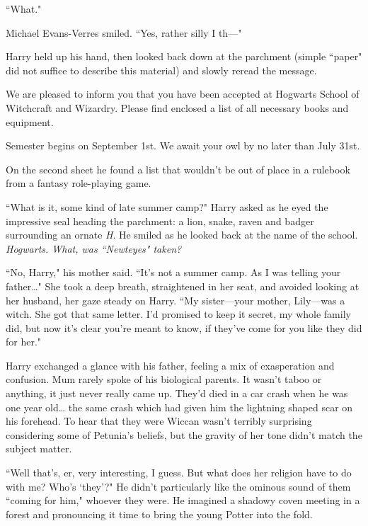 ``What."

Michael Evans-Verres smiled. ``Yes, rather silly I th---"

Harry held up his hand, then looked back down at the parchment (simple ``paper" did not suffice to describe this material) and slowly reread the message.

\begin{writtenNote}

We are pleased to inform you that you have been accepted at Hogwarts School of Witchcraft and Wizardry. Please find enclosed a list of all necessary books and equipment.

Semester begins on September 1st. We await your owl by no later than July 31st.


\end{writtenNote}

On the second sheet he found a list that wouldn't be out of place in a rulebook from a fantasy role-playing game.

``What is it, some kind of late summer camp?" Harry asked as he eyed the impressive seal heading the parchment: a lion, snake, raven and badger surrounding an ornate \emph{H}. He smiled as he looked back at the name of the school. \emph{Hogwarts. What, was ``Newteyes" taken?}

``No, Harry," his mother said. ``It's not a summer camp. As I was telling your father{\ldots}" She took a deep breath, straightened in her seat, and avoided looking at her husband, her gaze steady on Harry. ``My sister---your mother, Lily---was a witch. She got that same letter. I'd promised to keep it secret, my whole family did, but now it's clear you're meant to know, if they've come for you like they did for her."

Harry exchanged a glance with his father, feeling a mix of exasperation and confusion. Mum rarely spoke of his biological parents. It wasn't taboo or anything, it just never really came up. They'd died in a car crash when he was one year old{\ldots} the same crash which had given him the lightning shaped scar on his forehead. To hear that they were Wiccan wasn't terribly surprising considering some of Petunia's beliefs, but the gravity of her tone didn't match the subject matter.

``Well that's, er, very interesting, I guess. But what does her religion have to do with me? Who's `they'?" He didn't particularly like the ominous sound of them ``coming for him," whoever they were. He imagined a shadowy coven meeting in a forest and pronouncing it time to bring the young Potter into the fold.

